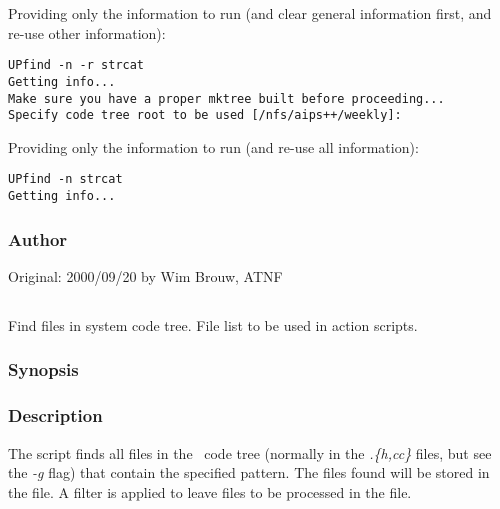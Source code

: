 \noindent
Providing only the information to run (and clear general information first,
and re-use other information):

\begin{verbatim}
UPfind -n -r strcat
Getting info...
Make sure you have a proper mktree built before proceeding...
Specify code tree root to be used [/nfs/aips++/weekly]: 
\end{verbatim}

\noindent
Providing only the information to run (and re-use all information):

\begin{verbatim}
UPfind -n strcat
Getting info...
\end{verbatim}

\subsubsection*{Author}

Original: 2000/09/20 by Wim Brouw, ATNF


\subsection{}
\label{UPfind}

Find files in system code tree. File list to be used in action 
scripts.

\subsubsection*{Synopsis}

\begin{synopsis}
\end{synopsis}

\subsubsection*{Description}

The  script finds all files in the \aipspp\ code tree (normally
in the {\em .\{h,cc\}} files, but see the {\em -g} flag) that contain the
specified pattern. The files found will be stored in the  file. A filter is applied to leave files to be processed in the
 file.

